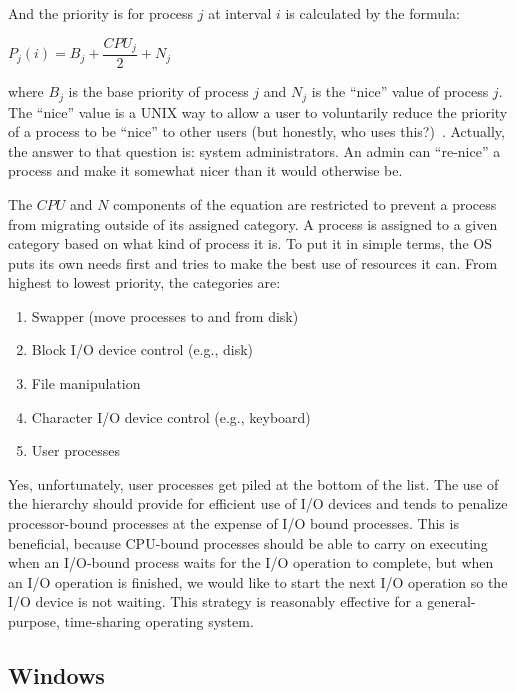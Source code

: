 And the priority is for process $j$ at interval $i$ is calculated by the formula:

\begin{center}
$P_{j}(i) = B_{j} + \dfrac{CPU_{j}}{2} + N_{j}$
\end{center}

where $B_{j}$ is the base priority of process $j$ and $N_{j}$ is the ``nice'' value of process $j$. The ``nice'' value is a UNIX way to allow a user to voluntarily reduce the priority of a process to be ``nice'' to other users (but honestly, who uses this?)~\cite{mos}. Actually, the answer to that question is: system administrators. An admin can ``re-nice'' a process and make it somewhat nicer than it would otherwise be.

The $CPU$ and $N$ components of the equation are restricted to prevent a process from migrating outside of its assigned category. A process is assigned to a given category based on what kind of process it is. To put it in simple terms, the OS puts its own needs first and tries to make the best use of resources it can. From highest to lowest priority, the categories are:

\begin{enumerate}
	\item Swapper (move processes to and from disk)
	\item Block I/O device control (e.g., disk)
	\item File manipulation
	\item Character I/O device control (e.g., keyboard)
	\item User processes
\end{enumerate}

Yes, unfortunately, user processes get piled at the bottom of the list. The use of the hierarchy should provide for efficient use of I/O devices and tends to penalize processor-bound processes at the expense of I/O bound processes. This is beneficial, because CPU-bound processes should be able to carry on executing when an I/O-bound process waits for the I/O operation to complete, but when an I/O operation is finished, we would like to start the next I/O operation so the I/O device is not waiting. This strategy is reasonably effective for a general-purpose, time-sharing operating system.

\subsection*{Windows}

